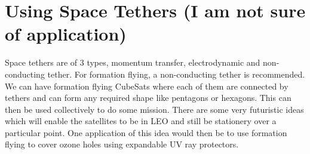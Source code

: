 \documentclass[11pt,a4paper]{article}
\begin{document}
\section{Using Space Tethers (I am not sure of application)}

Space tethers are of 3 types, momentum transfer, electrodynamic and non-conducting tether. For formation flying, a non-conducting tether is recommended. We can have formation flying CubeSats where each of them are connected by tethers and can form any required shape like pentagons or hexagons. This can then be used collectively to do some mission. There are some very futuristic ideas which will enable the satellites to be in LEO and still be stationery over a particular point. One application of this idea would then be to use formation flying to cover ozone holes using expandable UV ray protectors. 
\end{document}

